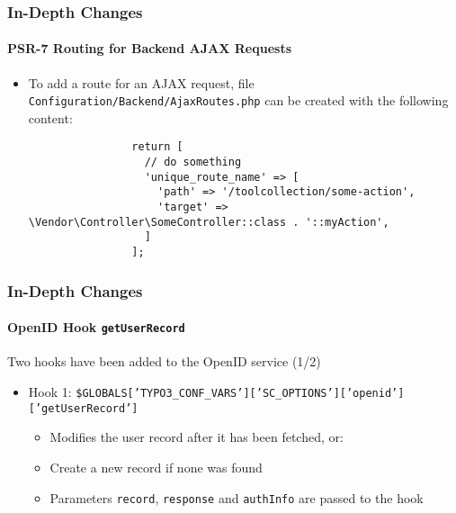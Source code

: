 \begin{frame}[fragile]
	\frametitle{In-Depth Changes}
	\framesubtitle{PSR-7 Routing for Backend AJAX Requests}

	\lstset{basicstyle=\tiny\ttfamily}

	\begin{itemize}

		\item To add a route for an AJAX request, file
			\texttt{Configuration/Backend/AjaxRoutes.php}\newline
			can be created with the following content:

			\begin{lstlisting}
				return [
				  // do something
				  'unique_route_name' => [
				    'path' => '/toolcollection/some-action',
				    'target' => \Vendor\Controller\SomeController::class . '::myAction',
				  ]
				];
			\end{lstlisting}

	\end{itemize}

\end{frame}

\begin{frame}[fragile]
	\frametitle{In-Depth Changes}
	\framesubtitle{OpenID Hook \texttt{getUserRecord}}

	\lstset{basicstyle=\tiny\ttfamily}

	Two hooks have been added to the OpenID service (1/2)

		\begin{itemize}

			\item Hook 1:\newline
				\smaller\smaller
					\texttt{\$GLOBALS['TYPO3\_CONF\_VARS']['SC\_OPTIONS']['openid']['getUserRecord']}
				\normalsize

				\begin{itemize}
					\item Modifies the user record after it has been fetched, or:
					\item Create a new record if none was found
					\item Parameters \texttt{record}, \texttt{response} and \texttt{authInfo} are passed to the hook
				\end{itemize}

		\end{itemize}

\end{frame}

